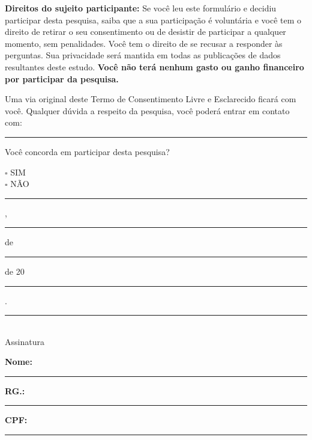 \vspace{0.15cm}

\noindent
\textbf{Direitos do sujeito participante:} Se você leu este formulário e decidiu participar desta
pesquisa, saiba que a sua participação é voluntária e você tem o direito de retirar o seu
consentimento ou de desistir de participar a qualquer momento, sem penalidades. Você tem
o direito de se recusar a responder às perguntas. Sua privacidade será mantida em todas as
publicações de dados resultantes deste estudo. \textbf{Você não terá nenhum gasto ou ganho
financeiro por participar da pesquisa.}

\vspace{0.15cm}

\noindent
Uma via original deste Termo de Consentimento Livre e Esclarecido ficará com você.
Qualquer dúvida a respeito da pesquisa, você poderá entrar em contato com:

\noindent
\rule{\textwidth}{0.4pt}

\vspace{0.25cm}

\noindent
Você concorda em participar desta pesquisa?

\vspace{0.1cm}

\noindent
$\square$ SIM\\
$\square$ NÃO

\vspace{0.3cm}

\begin{center}
    \rule{5cm}{0.4pt}, \rule{1cm}{0.4pt} de \rule{2.5cm}{0.4pt} de 20\rule{0.8cm}{0.4pt}.
\end{center}

\vspace{0.5cm}

\begin{center}
    \rule{8cm}{0.4pt}\\
    Assinatura
\end{center}

\vspace{0.15cm}

\noindent
\textbf{Nome:} \rule{10cm}{0.4pt}

\vspace{0.15cm}

\noindent
\textbf{RG.:} \rule{4.5cm}{0.4pt} \hfill \textbf{CPF:} \rule{4.5cm}{0.4pt}
